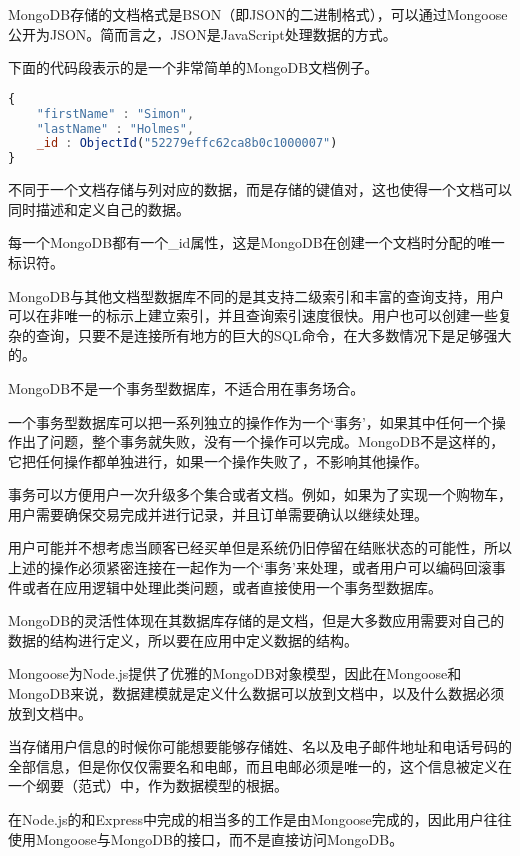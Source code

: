 MongoDB存储的文档格式是BSON（即JSON的二进制格式），可以通过Mongoose公开为JSON。简而言之，JSON是JavaScript处理数据的方式。

下面的代码段表示的是一个非常简单的MongoDB文档例子。

\begin{lstlisting}[language=JavaScript]
{
    "firstName" : "Simon",    
    "lastName" : "Holmes", 
    _id : ObjectId("52279effc62ca8b0c1000007")    
}
\end{lstlisting}

不同于一个文档存储与列对应的数据，而是存储的键值对，这也使得一个文档可以同时描述和定义自己的数据。

每一个MongoDB都有一个\_id属性，这是MongoDB在创建一个文档时分配的唯一标识符。

MongoDB与其他文档型数据库不同的是其支持二级索引和丰富的查询支持，用户可以在非唯一的标示上建立索引，并且查询索引速度很快。用户也可以创建一些复杂的查询，只要不是连接所有地方的巨大的SQL命令，在大多数情况下是足够强大的。

MongoDB不是一个事务型数据库，不适合用在事务场合。

一个事务型数据库可以把一系列独立的操作作为一个‘事务’，如果其中任何一个操作出了问题，整个事务就失败，没有一个操作可以完成。MongoDB不是这样的，它把任何操作都单独进行，如果一个操作失败了，不影响其他操作。

事务可以方便用户一次升级多个集合或者文档。例如，如果为了实现一个购物车，用户需要确保交易完成并进行记录，并且订单需要确认以继续处理。

用户可能并不想考虑当顾客已经买单但是系统仍旧停留在结账状态的可能性，所以上述的操作必须紧密连接在一起作为一个‘事务’来处理，或者用户可以编码回滚事件或者在应用逻辑中处理此类问题，或者直接使用一个事务型数据库。

MongoDB的灵活性体现在其数据库存储的是文档，但是大多数应用需要对自己的数据的结构进行定义，所以要在应用中定义数据的结构。

Mongoose为Node.js提供了优雅的MongoDB对象模型，因此在Mongoose和MongoDB来说，数据建模就是定义什么数据可以放到文档中，以及什么数据必须放到文档中。



当存储用户信息的时候你可能想要能够存储姓、名以及电子邮件地址和电话号码的全部信息，但是你仅仅需要名和电邮，而且电邮必须是唯一的，这个信息被定义在一个纲要（范式）中，作为数据模型的根据。


在Node.js的和Express中完成的相当多的工作是由Mongoose完成的，因此用户往往使用Mongoose与MongoDB的接口，而不是直接访问MongoDB。


